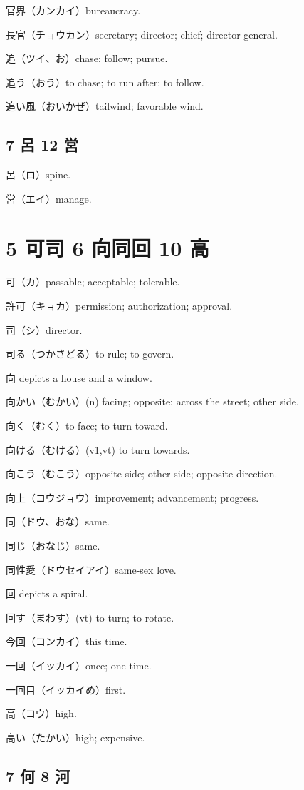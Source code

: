 官界（カンカイ）bureaucracy.

長官（チョウカン）secretary; director; chief; director general.

追（ツイ、お）chase; follow; pursue.

追う（おう）to chase; to run after; to follow.

追い風（おいかぜ）tailwind; favorable wind.

\subsection{7 呂 12 営}

呂（ロ）spine.

営（エイ）manage.

\section{5 可司 6 向同回 10 高}

可（カ）passable; acceptable; tolerable.

許可（キョカ）permission; authorization; approval.

司（シ）director.

司る（つかさどる）to rule; to govern.

向 depicts a house and a window.

向かい（むかい）(n) facing; opposite; across the street; other side.

向く（むく）to face; to turn toward.

向ける（むける）(v1,vt) to turn towards.

向こう（むこう）opposite side; other side; opposite direction.

向上（コウジョウ）improvement; advancement; progress.

同（ドウ、おな）same.

同じ（おなじ）same.

同性愛（ドウセイアイ）same-sex love.

回 depicts a spiral.

回す（まわす）(vt) to turn; to rotate.

今回（コンカイ）this time.

一回（イッカイ）once; one time.

一回目（イッカイめ）first.

高（コウ）high.

高い（たかい）high; expensive.

\subsection{7 何 8 河}


